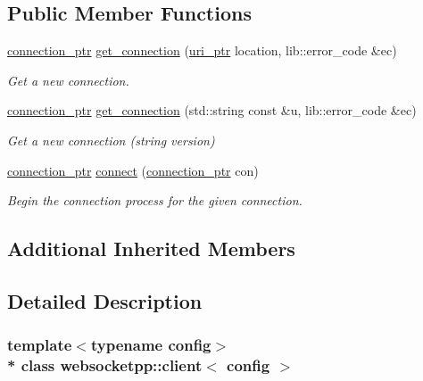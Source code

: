 \subsection*{Public Member Functions}
\begin{DoxyCompactItemize}
\item 
\hyperlink{classwebsocketpp_1_1client_a2e187bbb2beac676bbfbc2e8065de83e}{connection\+\_\+ptr} \hyperlink{classwebsocketpp_1_1client_aa95cec974921e32bc37a61c683ae240d}{get\+\_\+connection} (\hyperlink{namespacewebsocketpp_aae370ea5ac83a8ece7712cb39fc23f5b}{uri\+\_\+ptr} location, lib\+::error\+\_\+code \&ec)
\begin{DoxyCompactList}\small\item\em Get a new connection. \end{DoxyCompactList}\item 
\hyperlink{classwebsocketpp_1_1client_a2e187bbb2beac676bbfbc2e8065de83e}{connection\+\_\+ptr} \hyperlink{classwebsocketpp_1_1client_a1197f043c8c6c03398e4f07be4bdf135}{get\+\_\+connection} (std\+::string const \&u, lib\+::error\+\_\+code \&ec)
\begin{DoxyCompactList}\small\item\em Get a new connection (string version) \end{DoxyCompactList}\item 
\hyperlink{classwebsocketpp_1_1client_a2e187bbb2beac676bbfbc2e8065de83e}{connection\+\_\+ptr} \hyperlink{classwebsocketpp_1_1client_a818c30343180123bf1fee6dc21524bae}{connect} (\hyperlink{classwebsocketpp_1_1client_a2e187bbb2beac676bbfbc2e8065de83e}{connection\+\_\+ptr} con)
\begin{DoxyCompactList}\small\item\em Begin the connection process for the given connection. \end{DoxyCompactList}\end{DoxyCompactItemize}
\subsection*{Additional Inherited Members}


\subsection{Detailed Description}
\subsubsection*{template$<$typename config$>$\\*
class websocketpp\+::client$<$ config $>$}

